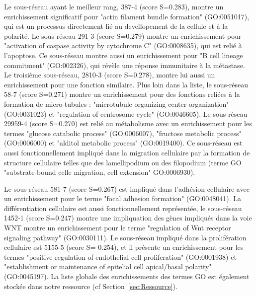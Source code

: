 		Le sous-réseau ayant le meilleur rang, 387-4 (score S=0.283), montre un enrichissement significatif pour "actin filament bundle formation" (GO:0051017), qui est un processus directement lié au devellopement de la cellule et à la polarité.
		Le sous-réseau 291-3 (score S=0.279) montre un enrichissement pour "activation of caspase activity by cytochrome C" (GO:0008635), qui est relié à l'apoptose.
		Ce sous-réseau montre aussi un enrichissement pour "B cell lineage commitment" (GO:002326), qui révèle une réponse immunitaire à la métastase.
		Le troisième sous-réseau, 2810-3 (score S=0.278), montre lui aussi un enrichissement pour une fonction similaire.
		Plus loin dans la liste, le sous-réseau 58-7 (score S=0.271) montre un enrichissement pour des fonctions reliées à la formation de micro-tubules : "microtubule organizing center organization" (GO:0031023) et "regulation of centrosome cycle" (GO:0046605).
		Le sous-réseau 29959-4 (score S=0.270) est relié au métabolisme avec un enrichissement pour les termes "glucose catabolic process" (GO:0006007), "fructose metabolic process" (GO:0006000) et "alditol metabolic process" (GO:0019400).
		Ce sous-réseau est aussi fonctionnellement impliqué dans la migration cellulaire par la formation de structure cellulaire telles que des lamellipodium ou des filopodium (terme GO "substrate-bound celle migration, cell extension" GO:0006930).

\pagebreak

		Le sous-réseau 581-7 (score S=0.267) est impliqué dans l'adhésion cellulaire avec un enrichissement pour le terme "focal adhesion formation" (GO:0048041).
		La différentiation cellulaire est aussi fonctionnellement représentée, le sous-réseau 1452-1 (score S=0.247) montre une impliquation des gènes impliqués dans la voie \acs{WNT} montre un enrichissement pour le terme "regulation of Wnt receptor signaling pathway" (GO:0030111).
		Le sous-réseau impliqué dans la prolifération cellulaire est 5155-5 (score S= 0.254), et il présente un enrichissement pour les termes "positive regulation of endothelial cell proliferation" (GO:0001938) et "establishment or maintenance of epitelial cell apical/basal polarity" (GO:0045197).
		La liste globale des enrichissements des termes GO est également stockée dans notre ressource (cf Section~\ref{sec:Ressource}).

